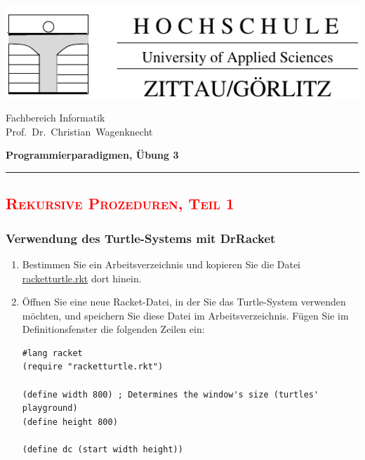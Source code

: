 \documentclass[12pt,a4paper]{scrartcl}
\newcommand\HR{\rule{175mm}{0.4pt}}
\begin{document}
\begin{minipage}[b]{174mm}
  \begin{minipage}[t]{80mm}
    \par\vspace{0mm}
    \textcolor{blue}{\includegraphics[scale=0.8]{fh-logo.pdf}}
  \end{minipage}\hfill
  \begin{minipage}[t]{76mm}                      %
    \par\vspace{2mm}
    {\sc Fachbereich Informatik}\\
    {\sc Prof.~Dr.~Christian~Wagenknecht}\\
    \par
    \textbf{Programmierparadigmen, \"{U}bung 3}
  \end{minipage}
\end{minipage}
\HR


\subsection*{\textcolor{red}{\textsc{Rekursive Prozeduren, Teil 1}}}


\subsubsection*{Verwendung des Turtle-Systems mit DrRacket}

\begin{enumerate}
\item 
Bestimmen Sie ein Arbeitsverzeichnis und kopieren Sie die Datei\\ \href{http://f-ei.hszg.de/wagenkn/PP-Racket/downloads/racket/racketturtle.rkt}{racketturtle.rkt} dort hinein.

\item 
Öffnen Sie eine neue Racket-Datei, in der Sie das Turtle-System verwenden möchten, und speichern Sie diese Datei im Arbeitsverzeichnis. F\"{u}gen Sie im Definitionsfenster die folgenden Zeilen ein:
\begin{verbatim}
#lang racket
(require "racketturtle.rkt")

(define width 800) ; Determines the window's size (turtles' playground)
(define height 800)

(define dc (start width height))  
\end{verbatim}
\end{enumerate}
\end{document}
